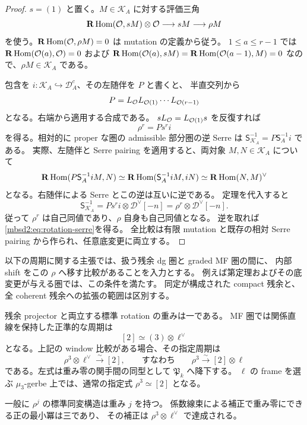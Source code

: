 \begin{proof}
$s=(1)$ と置く。$M\in\mathscr K_A$ に対する評価三角
\[
 \mathbf R\operatorname{Hom}(\mathcal O,sM)\otimes\mathcal O\longrightarrow sM\longrightarrow\rho M
\]
を使う。$\mathbf R\operatorname{Hom}(\mathcal O,\rho M)=0$ は mutation の定義から従う。
$1\leq a\leq r-1$ では
$\mathbf R\operatorname{Hom}(\mathcal O(a),\mathcal O)=0$ および
$\mathbf R\operatorname{Hom}(\mathcal O(a),sM)
=\mathbf R\operatorname{Hom}(\mathcal O(a-1),M)=0$ なので、$\rho M\in\mathscr K_A$ である。

包含を $i:\mathscr K_A\hookrightarrow\mathscr D_A^c$、その左随伴を $P$ と書くと、
半直交列から
\[
 P=L_{\mathcal O}L_{\mathcal O(1)}\cdots L_{\mathcal O(r-1)}
\]
となる。右端から適用する合成である。
$sL_{\mathcal O}=L_{\mathcal O(1)}s$ を反復すれば
\[
 \rho^r=P s^r i
\]
を得る。相対的に proper な圏の admissible 部分圏の逆 Serre は
$\mathsf S_{\mathscr K_A}^{-1}=P\mathsf S_A^{-1}i$ である。
実際、左随伴と Serre pairing を適用すると、両対象 $M,N\in\mathscr K_A$ について
\[
 \mathbf R\operatorname{Hom}(P\mathsf S_A^{-1}iM,N)
 \simeq\mathbf R\operatorname{Hom}(\mathsf S_A^{-1}iM,iN)
 \simeq\mathbf R\operatorname{Hom}(N,M)^\vee
\]
となる。右随伴による Serre とこの逆は互いに逆である。
定理を代入すると
\[
 \mathsf S_{\mathscr K_A}^{-1}
   =P s^r i\otimes\mathscr D^\vee[-n]
   =\rho^r\otimes\mathscr D^\vee[-n].
\]
従って $\rho^r$ は自己同値であり、$\rho$ 自身も自己同値となる。
逆を取れば \eqref{mbsd2:eq:rotation-serre}を得る。
全比較は有限 mutation と既存の相対 Serre pairing から作られ、任意底変更に両立する。
\end{proof}

以下の周期に関する主張では、扱う残余 dg 圏と graded MF 圏の間に、
内部 shift をこの $\rho$ へ移す比較があることを入力とする。
例えば第定理およびその底変更が与える圏では、この条件を満たす。
同定が構成された compact 残余と、全 coherent 残余への拡張の範囲は区別する。

\begin{proposition}[係数直線を含む三次周期]
\label{mbsd2:prop:line-period}
残余 projector と両立する標準 rotation の重みは一である。
MF 圏では関係直線を保持した正準的な周期は
\begin{equation}\label{mbsd2:eq:mf-line-period}
 [2]\simeq(3)\otimes\ell^\vee
\end{equation}
となる。上記の window 比較がある場合、その指定周期は
\begin{equation}\label{mbsd2:eq:rotation-line-period}
 \rho^3\otimes\ell^\vee\xrightarrow{\sim}[2],
 \qquad\text{すなわち}\qquad
 \rho^3\xrightarrow{\sim}[2]\otimes\ell
\end{equation}
である。左式は重み零の関手間の同型として $\mathfrak P_k$ へ降下する。
$\ell$ の frame を選ぶ $\mu_3$-gerbe 上では、通常の指定式 $\rho^3\simeq[2]$ となる。

一般に $\rho^j$ の標準同変構造は重み $j$ を持つ。
係数線束による補正で重み零にできる正の最小冪は三であり、
その補正は $\rho^3\otimes\ell^\vee$ で達成される。
\end{proposition}

